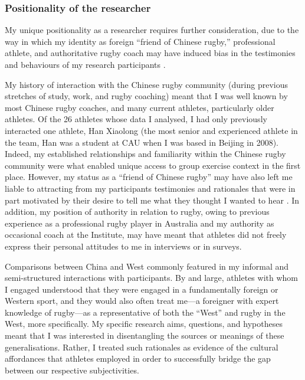 \begin{CJK}{UTF8}{gbsn}


\subsubsection{Positionality of the researcher}
My unique positionality as a researcher requires further consideration, due to the way in which my identity as foreign ``friend of Chinese rugby,'' professional athlete, and authoritative rugby coach may have induced bias in the testimonies and behaviours of my research participants \citep[referred to in experimental psychology as ``demand characteristics''][]{McCambridge2012}.

My history of interaction with the Chinese rugby community (during previous stretches of study, work, and rugby coaching) meant that I was well known by most Chinese rugby coaches, and many current athletes, particularly older athletes.  Of the 26 athletes whose data I analysed, I had only previously interacted one athlete, Han Xiaolong (the most senior and experienced athlete in the team, Han was a student at CAU when I was based in Beijing in 2008).  Indeed, my established relationships and familiarity within the Chinese rugby community were what enabled unique access to group exercise context in the first place.  However, my status as a ``friend of Chinese rugby'' may have also left me liable to attracting from my participants testimonies and rationales that were in part motivated by their desire to tell me what they thought I wanted to hear \citep{Clifford1986}.  In addition, my position of authority in relation to rugby, owing to previous experience as a professional rugby player in Australia and my authority as occasional coach at the Institute, may have meant that athletes did not freely express their personal attitudes to me in interviews or in surveys.

Comparisons between China and West commonly featured in my informal and semi-structured interactions with participants.  By and large, athletes with whom I engaged understood that they were engaged in a fundamentally foreign or Western sport, and they would also often treat me---a foreigner with expert knowledge of rugby---as a representative of both the ``West'' and rugby in the West, more specifically.  My specific research aims, questions, and hypotheses meant that I was interested in disentangling the sources or meanings of these generalisations.  Rather, I treated such rationales as evidence of the cultural affordances that athletes employed in order to successfully bridge the gap between our respective subjectivities.


\end{CJK}
